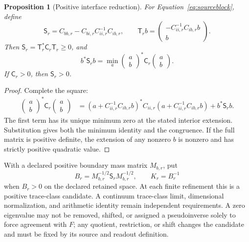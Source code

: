 \documentclass[11pt,letterpaper]{article}
\numberwithin{equation}{section}
\newtheorem{proposition}[theorem]{Proposition}
\theoremstyle{definition}
\theoremstyle{remark}
\begin{document}
\begin{proposition}[Positive interface reduction]
\label{prop:schurpositive}
For Equation~\eqref{eq:sourceblock}, define
\begin{equation}
 \mathsf S_r=C_{bb,r}-C_{bi,r}C_{ii,r}^{-1}C_{ib,r},
 \qquad
 \mathsf T_r b=\begin{pmatrix}-C_{ii,r}^{-1}C_{ib,r}b\\b\end{pmatrix}.
 \label{eq:schurresponse}
\end{equation}
Then $\mathsf S_r=\mathsf T_r^{*}\mathsf C_r\mathsf T_r\geq0$, and
\begin{equation}
 b^{*}\mathsf S_rb
 =\min_{a}\begin{pmatrix}a\\b\end{pmatrix}^{*}
                  \mathsf C_r\begin{pmatrix}a\\b\end{pmatrix}.
 \label{eq:schurminimum}
\end{equation}
If $\mathsf C_r>0$, then $\mathsf S_r>0$.
\end{proposition}
\begin{proof}
Complete the square:
\begin{align*}
 \begin{pmatrix}a\\b\end{pmatrix}^{*}\mathsf C_r
 \begin{pmatrix}a\\b\end{pmatrix}
 &=\left(a+C_{ii,r}^{-1}C_{ib,r}b\right)^{*}C_{ii,r}
   \left(a+C_{ii,r}^{-1}C_{ib,r}b\right)+b^{*}\mathsf S_rb.
\end{align*}
The first term has its unique minimum zero at the stated interior extension. Substitution gives both the minimum identity and the congruence. If the full matrix is positive definite, the extension of any nonzero $b$ is nonzero and has strictly positive quadratic value.
\end{proof}

With a declared positive boundary mass matrix $M_{b,r}$, put
\begin{equation}
 B_r=M_{b,r}^{-1/2}\mathsf S_rM_{b,r}^{-1/2},
 \qquad K_r=B_r^{-1}
 \label{eq:boundarycandidate}
\end{equation}
when $B_r>0$ on the declared retained space. At each finite refinement this is a positive trace-class candidate. A continuum trace-class limit, dimensional normalization, and arithmetic identity remain independent requirements. A zero eigenvalue may not be removed, shifted, or assigned a pseudoinverse solely to force agreement with $F$; any quotient, restriction, or shift changes the candidate and must be fixed by its source and readout definition.
\end{document}
